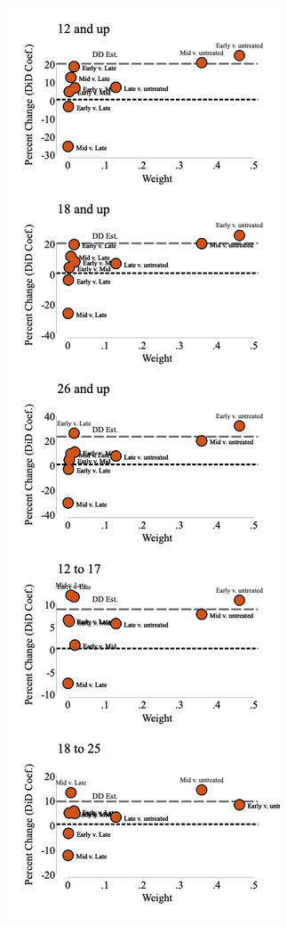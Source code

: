 \documentclass[12pt]{article}%
\begin{document}
\begin{appendices}
\begin{figure}
\begin{minipage}{.9\linewidth}
\begin{subfigure}[b]{0.32\columnwidth}
    \includegraphics[width=\linewidth]{../output/plots/bacon_weights_ln_mj_use_365.png}

\end{subfigure}
\end{minipage}
\end{figure}
\end{appendices}
\end{document}
